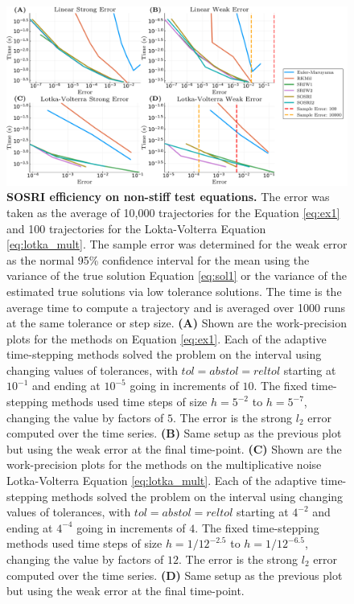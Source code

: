 \documentclass{article}
\begin{document}
\begin{center}
	\begin{figure}
		\begin{centering}
			\includegraphics[scale=0.33]{paper_figures/SRI_efficiency}
			\par\end{centering}
		\caption{\textbf{SOSRI efficiency on non-stiff test equations.} The error was
			taken as the average of 10,000 trajectories for the Equation \ref{eq:ex1}
			and 100 trajectories for the Lokta-Volterra Equation \ref{eq:lotka_mult}.
			The sample error was determined for the weak error as the normal 95\%
			confidence interval for the mean using the variance of the true solution
			Equation \ref{eq:sol1} or the variance of the estimated true solutions
			via low tolerance solutions. The time is the average time to compute
			a trajectory and is averaged over 1000 runs at the same tolerance
			or step size.\textbf{ (A)} Shown are the work-precision plots for
			the methods on Equation \ref{eq:ex1}. Each of the adaptive time-stepping
			methods solved the problem on the interval using changing values of
			tolerances, with $tol=abstol=reltol$ starting at $10^{-1}$ and ending
			at $10^{-5}$ going in increments of $10$. The fixed time-stepping
			methods used time steps of size $h=5^{-2}$ to $h=5^{-7}$, changing
			the value by factors of $5$. The error is the strong $l_{2}$ error
			computed over the time series. \textbf{(B)} Same setup as the previous
			plot but using the weak error at the final time-point. \textbf{(C)
			}Shown are the work-precision plots for the methods on the multiplicative
			noise Lotka-Volterra Equation \ref{eq:lotka_mult}. Each of the adaptive
			time-stepping methods solved the problem on the interval using changing
			values of tolerances, with $tol=abstol=reltol$ starting at $4^{-2}$
			and ending at $4^{-4}$ going in increments of $4$. The fixed time-stepping
			methods used time steps of size $h=1/12^{-2.5}$ to $h=1/12^{-6.5}$,
			changing the value by factors of $12$. The error is the strong $l_{2}$
			error computed over the time series. \textbf{(D)} Same setup as the
			previous plot but using the weak error at the final time-point. \label{fig:SOSRI-efficiency}}
	\end{figure}
	\par\end{center}
\end{document}

